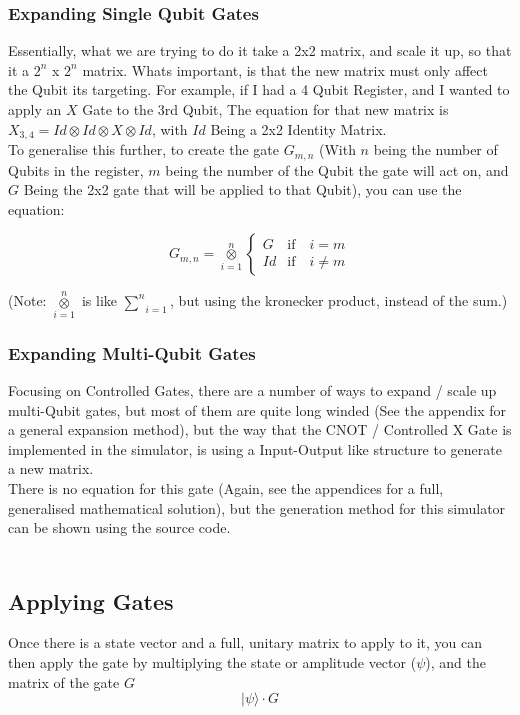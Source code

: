 \documentclass[../main.tex]{subfiles}
\begin{document}
\subsubsection{Expanding Single Qubit Gates}
Essentially, what we are trying to do it take a 2x2 matrix, and scale it up, so that it a \(2^n\) x \(2^n\) matrix. Whats important, is that the new matrix must only affect the Qubit its targeting. For example, if I had a 4 Qubit Register, and I wanted to apply an \(X\) Gate to the 3rd Qubit, The equation for that new matrix is \(X_{3,4} = Id \otimes Id \otimes X \otimes Id \), with \(Id\) Being a 2x2 Identity Matrix. \\
To generalise this further, to create the gate \(G_{m,n}\) (With \(n\) being the number of Qubits in the register, \(m\) being the number of the Qubit the gate will act on, and \(G\) Being the 2x2 gate that will be applied to that Qubit), 
you can use the equation:

\begin{equation} \label{eq:single-gate-gen}
	G_{m,n} = \underset{i=1}{\overset{n}{\otimes}}
	\begin{cases}
    	G & \text{if} \quad i = m \\
    	Id & \text{if} \quad i \neq m
	\end{cases}
\end{equation}

(Note: \(\underset{i=1}{\overset{n}{\otimes}}\) is like \(\underset{i=1}{\overset{n}{\sum}}\), but using the kronecker product, instead of the sum.)

\subsubsection{Expanding Multi-Qubit Gates}
Focusing on Controlled Gates, there are a number of ways to expand / scale up multi-Qubit gates, but most of them are quite long winded (See the appendix for a general expansion method),
but the way that the CNOT / Controlled X Gate is implemented in the simulator, is using a Input-Output like structure to generate a new matrix. \\
There is no equation for this gate (Again, see the appendices for a full, generalised mathematical solution), but the generation method for this simulator can be shown using the source code. \\ \\ 

\subsection{Applying Gates}
Once there is a state vector and a full, unitary matrix to apply to it,
you can then apply the gate by multiplying the state or amplitude vector (\(\psi\)), and the matrix of the gate \(G\) \\
\begin{equation}
	\lvert\psi\rangle \cdot G
\end{equation}
\end{document}
